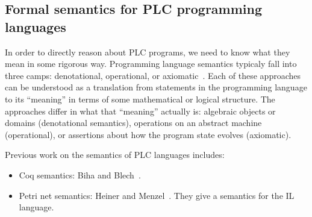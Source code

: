 \subsection{Formal semantics for PLC programming languages}

In order to directly reason about PLC programs, we need to know what they mean
in some rigorous way. Programming language semantics typicaly fall into three
camps: denotational, operational, or axiomatic~\cite{hoare:axiomatic}. Each of
these approaches can be understood as a translation from statements in the
programming language to its ``meaning'' in terms of some mathematical or logical
structure. The approaches differ in what that ``meaning'' actually is: algebraic
objects or domains (denotational semantics), operations on an abstract machine
(operational), or assertions about how the program state evolves (axiomatic).

Previous work on the semantics of PLC languages includes:

\begin{itemize}

\item Coq semantics: Biha and Blech~\cite{biha:plc_sem1, biha:plc_sem2,
biha:plc_sem3}.

\item Petri net semantics: Heiner and Menzel~\cite{heiner:petri}. They give a
semantics for the IL language.

\end{itemize}

